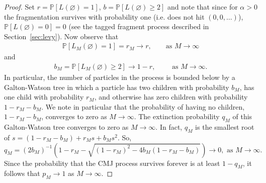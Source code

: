 \documentclass[a4,12pt]{amsart}
\numberwithin{equation}{section}
\newcommand{\MassP}{\mathcal{P}_{\rm m}}
\begin{document}
\begin{proof}
	Set $r = \mathbb{P}[ L(\varnothing) = 1]$, $b=\mathbb{P}[L(\varnothing)\geq 2]$
	and note that since for $\alpha>0$ the fragmentation survives with probability one (i.e. does not hit $(0, 0, \ldots)$), 
	$\mathbb{P}[L(\varnothing)=0] =0$ (see the tagged fragment process described in Section~\ref{sec:levy}).
	Now observe that 
	\begin{align*}
		\mathbb{P}[ L_M(\varnothing) = 1 ] = r_M \to r,\qquad \text{as $M\to \infty$}
	\end{align*}
	and
	\begin{align*}
		b_M = \mathbb{P}[ L_M(\varnothing) \geq 2 ] \to 1 - r, \qquad \text{ as $M \to \infty$}.
	\end{align*}
	In particular, the number of particles in the process is bounded below by a Galton-Watson 
	tree in which a particle has two children with probability $b_M$, has one child with probability $r_M$, 
	and otherwise has zero children with probability $1-r_M-b_M$. We note in particular that the probability of 
	having no children, $1 - r_M- b_M$, converges to zero as $M \to \infty$. 
	The extinction probability $q_M$ of this Galton-Watson tree converges to zero as $M \to \infty$. 
	In fact, $q_M$ is the smallest root of $s = ( 1 - r_M - b_M ) + r_Ms + b_M s^2$. So,
	\[
		q_M = (2b_M)^{-1}(1 - r_M  - \sqrt{ (1-r_M)^2 - 4 b_M ( 1 - r_M - b_M) })\rightarrow 0, \text{ as $M \to \infty$}.
	\]
Since the probability that the CMJ process survives forever is at least $1 - q_M$, it follows that $p_M \to 1$ as $M \to \infty$. 
\end{proof}

\end{document}
